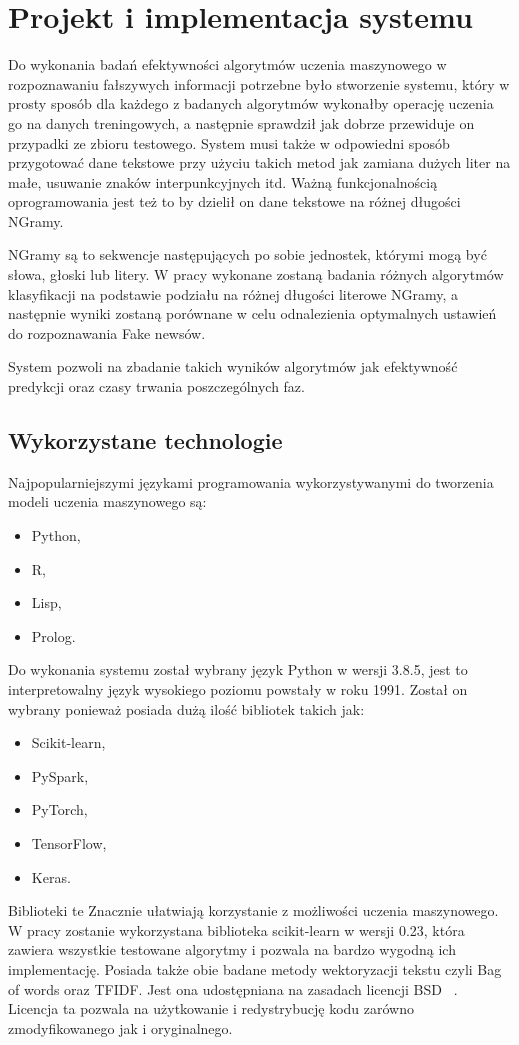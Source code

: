 \chapter{Projekt i implementacja systemu}
Do wykonania badań efektywności algorytmów uczenia maszynowego w rozpoznawaniu
fałszywych informacji potrzebne było stworzenie systemu, który w prosty sposób 
dla każdego z badanych algorytmów wykonałby operację uczenia go na danych treningowych,
a następnie sprawdził jak dobrze przewiduje on przypadki ze zbioru testowego.
System musi także w odpowiedni sposób przygotować dane tekstowe przy użyciu takich
metod jak zamiana dużych liter na małe, usuwanie znaków interpunkcyjnych itd.
Ważną funkcjonalnością oprogramowania jest też to by dzielił on dane tekstowe na 
różnej długości NGramy. 

NGramy są to sekwencje następujących po sobie jednostek, którymi mogą być słowa, 
głoski lub litery. W pracy wykonane zostaną badania różnych algorytmów klasyfikacji
na podstawie podziału na różnej długości literowe NGramy, a następnie wyniki zostaną
porównane w celu odnalezienia optymalnych ustawień do rozpoznawania Fake newsów.

System pozwoli na zbadanie takich wyników algorytmów jak efektywność predykcji oraz 
czasy trwania poszczególnych faz.

\section{Wykorzystane technologie}
Najpopularniejszymi językami programowania wykorzystywanymi do tworzenia modeli uczenia
maszynowego są:
\begin{itemize}
    \item Python,
    \item R,
    \item Lisp,
    \item Prolog.
\end{itemize}
Do wykonania systemu został wybrany język Python w wersji 3.8.5, jest to interpretowalny
język wysokiego poziomu powstały w roku 1991. Został on wybrany 
ponieważ posiada dużą ilość bibliotek takich jak: 
\begin{itemize}
    \item Scikit-learn,
    \item PySpark,
    \item PyTorch,
    \item TensorFlow,
    \item Keras.
\end{itemize}
Biblioteki te Znacznie ułatwiają korzystanie z możliwości uczenia maszynowego.
W pracy zostanie wykorzystana biblioteka scikit-learn w wersji 0.23, która zawiera wszystkie 
testowane algorytmy i pozwala na bardzo wygodną ich implementację. Posiada także obie 
badane metody wektoryzacji tekstu czyli Bag of words oraz TFIDF. Jest ona udostępniana na zasadach licencji BSD ~\cite{scikitlearn}. 
Licencja ta pozwala na użytkowanie i redystrybucję kodu zarówno zmodyfikowanego jak i oryginalnego.

